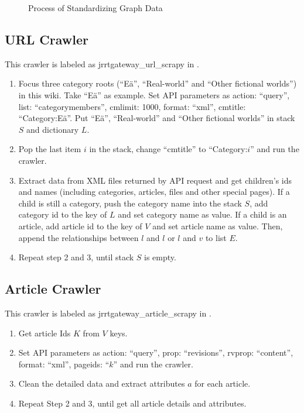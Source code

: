 \begin{figure}
	\centering
	\def\svgwidth{\columnwidth}
	
	\caption{Process of Standardizing Graph Data}
	\label{fig:section2-pic1}
\end{figure}

\subsection{URL Crawler}

This crawler is labeled as jrrtgateway\_url\_scrapy in .

\begin{enumerate}
	\item Focus three category roots (``Eä'', ``Real-world'' and ``Other fictional worlds'') in this wiki. Take ``Eä'' as example. Set API parameters as {action: ``query'', list: ``categorymembers'', cmlimit: 1000, format: ``xml'', cmtitle: ``Category:Eä''}. Put ``Eä'', ``Real-world'' and ``Other fictional worlds'' in stack $S$ and dictionary $L$.
	\item Pop the last item $i$ in the stack, change ``cmtitle'' to ``Category:$i$'' and run the crawler. 
	\item Extract data from XML files returned by API request and get children's ids and names (including categories, articles, files and other special pages). If a child is still a category, push the category name into the stack $S$, add category id to the key of $L$ and set category name as value. If a child is an article, add article id to the key of $V$ and set article name as value. Then, append the relationships between $l$ and $l$ or $l$ and $v$ to list $E$.
	\item Repeat step 2 and 3, until stack $S$ is empty.
\end{enumerate}

\subsection{Article Crawler}

This crawler is labeled as jrrtgateway\_article\_scrapy in .

\begin{enumerate}
	\item Get article Ids $K$ from $V$ keys.
	\item Set API parameters as {action: ``query'', prop: ``revisions'', rvprop: ``content'', format: ``xml'', pageids: ``$k$''} and run the crawler. 
	\item Clean the detailed data and extract attributes $a$ for each article.
	\item Repeat Step 2 and 3, until get all article details and attributes.
\end{enumerate}

